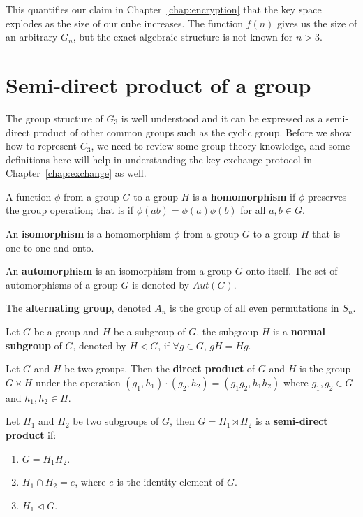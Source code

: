 This quantifies our claim in Chapter~\ref{chap:encryption} that the key space explodes as the size of our cube increases. The function $f(n)$ gives us the size of an arbitrary $G_n$, but the exact algebraic structure is not known for $n > 3$.

\section{Semi-direct product of a group}
The group structure of $G_3$ is well understood and it can be expressed as a semi-direct product of other common groups such as the cyclic group. Before we show how to represent $C_3$, we need to review some group theory knowledge, and some definitions here will help in understanding the key exchange protocol in Chapter~\ref{chap:exchange} as well. 
\begin{definition} A function $\phi$ from a group $G$ to a group $H$ is a \textbf{homomorphism} if $\phi$ preserves the group operation; that is if $\phi(ab) = \phi(a)\phi(b)$ for all $a, b \in G$.
\end{definition}
\begin{definition} An \textbf{isomorphism} is a homomorphism $\phi$ from a group $G$ to a group $H$ that is one-to-one and onto.
\end{definition}
\begin{definition} An \textbf{automorphism} is an isomorphism from a group $G$ onto itself. The set of automorphisms of a group $G$ is denoted by $Aut(G)$.
\end{definition}
\begin{definition} The \textbf{alternating group}, denoted $A_n$ is the group of all even permutations in $S_n$.
\end{definition}
\begin{definition} Let $G$ be a group and $H$ be a subgroup of $G$, the subgroup $H$ is a \textbf{normal subgroup} of $G$, denoted by $H \triangleleft G$, if $\forall g \in G$, $gH = Hg$.
\end{definition}
\begin{definition} Let $G$ and $H$ be two groups. Then the \textbf{direct product} of $G$ and $H$ is the group $G \times H$ under the operation $(g_1, h_1) \cdot (g_2, h_2) = (g_1g_2, h_1h_2)$ where $g_1,g_2 \in G$ and $h_1,h_2 \in H$.
\end{definition}
\begin{definition} Let $H_1$ and $H_2$ be two subgroups of $G$, then $G = H_1 \rtimes H_2$ is a \textbf{semi-direct product} if:
    \begin{enumerate}
        \item $G = H_1H_2$.
        \item $H_1 \cap H_2 = e$, where $e$ is the identity element of $G$.
        \item $H_1 \triangleleft G$.
    \end{enumerate}
\end{definition}
